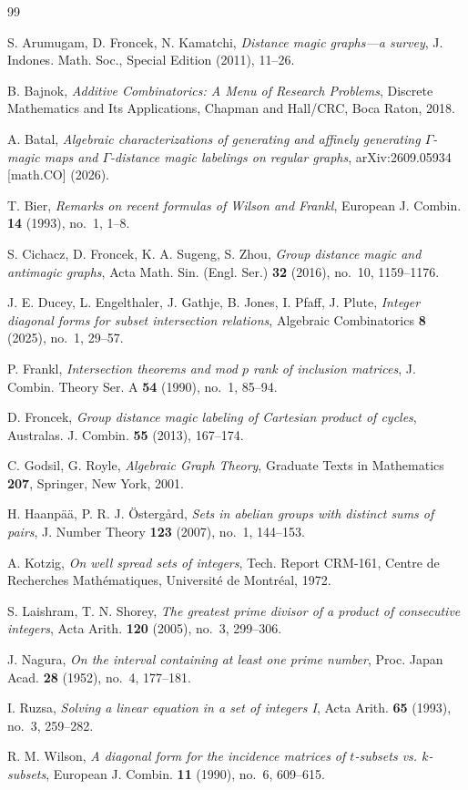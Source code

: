 \documentclass[11pt,reqno]{amsart}
\theoremstyle{plain}
\theoremstyle{definition}
\theoremstyle{remark}
\begin{document}
\begin{thebibliography}{99}

S. Arumugam, D. Froncek, N. Kamatchi,
\emph{Distance magic graphs---a survey},
J. Indones. Math. Soc., Special Edition (2011), 11--26.

B. Bajnok,
\emph{Additive Combinatorics: A Menu of Research Problems},
Discrete Mathematics and Its Applications, Chapman and Hall/CRC, Boca Raton,
2018.

A. Batal,
\emph{Algebraic characterizations of generating and affinely generating
$\Gamma$-magic maps and $\Gamma$-distance magic labelings on regular graphs},
arXiv:2609.05934 [math.CO] (2026).

T. Bier,
\emph{Remarks on recent formulas of Wilson and Frankl},
European J. Combin. \textbf{14} (1993), no.~1, 1--8.

S. Cichacz, D. Froncek, K. A. Sugeng, S. Zhou,
\emph{Group distance magic and antimagic graphs},
Acta Math. Sin. (Engl. Ser.) \textbf{32} (2016), no.~10, 1159--1176.

J. E. Ducey, L. Engelthaler, J. Gathje, B. Jones, I. Pfaff, J. Plute,
\emph{Integer diagonal forms for subset intersection relations},
Algebraic Combinatorics \textbf{8} (2025), no.~1, 29--57.

P. Frankl,
\emph{Intersection theorems and mod $p$ rank of inclusion matrices},
J. Combin. Theory Ser. A \textbf{54} (1990), no.~1, 85--94.

D. Froncek,
\emph{Group distance magic labeling of Cartesian product of cycles},
Australas. J. Combin. \textbf{55} (2013), 167--174.

C. Godsil, G. Royle,
\emph{Algebraic Graph Theory},
Graduate Texts in Mathematics \textbf{207}, Springer, New York, 2001.

H. Haanp\"a\"a, P. R. J. \"Osterg\r{a}rd,
\emph{Sets in abelian groups with distinct sums of pairs},
J. Number Theory \textbf{123} (2007), no.~1, 144--153.

A. Kotzig,
\emph{On well spread sets of integers},
Tech. Report CRM-161, Centre de Recherches Math\'ematiques,
Universit\'e de Montr\'eal, 1972.

S. Laishram, T. N. Shorey,
\emph{The greatest prime divisor of a product of consecutive integers},
Acta Arith. \textbf{120} (2005), no.~3, 299--306.

J. Nagura,
\emph{On the interval containing at least one prime number},
Proc. Japan Acad. \textbf{28} (1952), no.~4, 177--181.

I. Ruzsa,
\emph{Solving a linear equation in a set of integers I},
Acta Arith. \textbf{65} (1993), no.~3, 259--282.

R. M. Wilson,
\emph{A diagonal form for the incidence matrices of $t$-subsets vs. $k$-subsets},
European J. Combin. \textbf{11} (1990), no.~6, 609--615.

\end{thebibliography}
\end{document}
